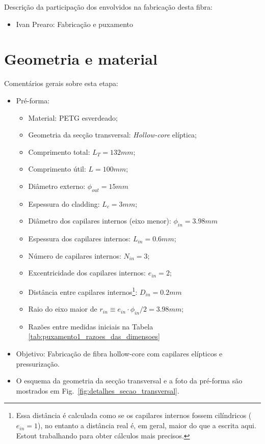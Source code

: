 \documentclass[12pt,a4paper]{article}
\newcommand{\diameter}{\phi}
\begin{document}
  Descrição da participação dos envolvidos na fabricação desta fibra:
  \begin{itemize}
    \item Ivan Prearo: Fabricação e puxamento
  \end{itemize}

  \section{Geometria e material}
  \label{sec:geometria}

  Comentários gerais sobre esta etapa:
  \begin{itemize}
    \item Pré-forma:
    \begin{itemize}
      \item Material: PETG esverdeado;
      \item Geometria da secção transversal: \textit{Hollow-core} elíptica;
      \item Comprimento total: \(L_T = 132 mm\);
      \item Comprimento útil: \(L = 100 mm\); 
      \item Diâmetro externo: \(\diameter_{out} = 15 mm\)
      \item Espessura do cladding: \(L_c = 3 mm\);
      \item Diâmetro dos capilares internos (eixo menor): \(\diameter_{in} = 3.98 mm\)
      \item Espessura dos capilares internos: \(L_{in} = 0.6 mm\);
      \item Número de capilares internos: \(N_{in} = 3\);
      \item Excentricidade dos capilares internos: \(e_{in} = 2\);
      \item Distância entre capilares internos\footnote{Essa distância é calculada como se os capilares internos fossem cilíndricos (\(e_{in} = 1\)), no entanto a distância real é, em geral, maior do que a escrita aqui. Estout trabalhando para obter cálculos mais precisos.}: \(D_{in} = 0.2 mm\)
      \item Raio do eixo maior de \(r_{in}\equiv e_{in}\cdot\phi_{in}/2=3.98 mm\);
      \item Razões entre medidas iniciais na Tabela \ref{tab:puxamento1_razoes_das_dimensoes}
    \end{itemize}
    \item Objetivo: Fabricação de fibra hollow-core com capilares elípticos e pressurização.
    \item O esquema da geometria da secção transversal e a foto da pré-forma são mostrados em Fig.~\ref{fig:detalhes_secao_transversal}.
  \end{itemize}
\end{document}

